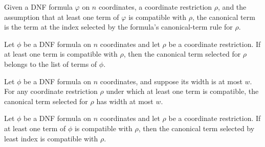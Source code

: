 \begin{definition}
\label{FABL.DNFFormula.canonicalTerm}
\leanok
{}
Given a DNF formula $\varphi$ on $n$ coordinates, a coordinate restriction $\rho$, and
the assumption that at least one term of $\varphi$ is compatible with $\rho$, the
canonical term is the term at the index selected by the formula's canonical-term rule
for $\rho$.
\end{definition}

\begin{theorem}
\label{FABL.DNFFormula.canonicalTerm_mem}
\leanok
{}
Let $\phi$ be a DNF formula on $n$ coordinates and let $\rho$ be a coordinate
restriction. If at least one term is compatible with $\rho$, then the canonical term
selected for $\rho$ belongs to the list of terms of $\phi$.
\end{theorem}

\begin{theorem}
\label{FABL.DNFFormula.canonicalTerm_width_le}
\leanok
{}
Let $\phi$ be a DNF formula on $n$ coordinates, and suppose its width is at most $w$.
For any coordinate restriction $\rho$ under which at least one term is compatible, the
canonical term selected for $\rho$ has width at most $w$.
\end{theorem}

\begin{theorem}
\label{FABL.DNFFormula.canonicalTerm_compatible'}
\leanok
{}
Let $\phi$ be a DNF formula on $n$ coordinates and let $\rho$ be a coordinate
restriction. If at least one term of $\phi$ is compatible with $\rho$, then the
canonical term selected by least index is compatible with $\rho$.
\end{theorem}


